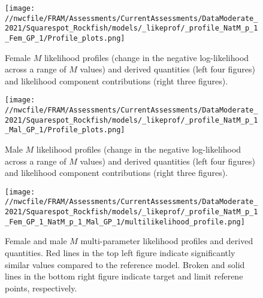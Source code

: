 \documentclass[11pt,
  english,
  a4paper,
]{article}
\begin{document}
\begin{figure}
\centering
\texttt{[image: //nwcfile/FRAM/Assessments/CurrentAssessments/DataModerate\_2021/Squarespot\_Rockfish/models/\_likeprof/\_profile\_NatM\_p\_1\_Fem\_GP\_1/Profile\_plots.png]}
\caption{Female {\(M\)\leavevmode\tagmcend\tagstructend} likelihood profiles (change in the negative log-likelihood across a range of {\(M\)\leavevmode\tagmcend\tagstructend} values) and derived quantities (left four figures) and likelihood component contributions (right three figures).\label{fig:M_f-profile-combo}}
\end{figure}

\tagmcend\tagstructend


\begin{figure}
\centering
\texttt{[image: //nwcfile/FRAM/Assessments/CurrentAssessments/DataModerate\_2021/Squarespot\_Rockfish/models/\_likeprof/\_profile\_NatM\_p\_1\_Mal\_GP\_1/Profile\_plots.png]}
\caption{Male {\(M\)\leavevmode\tagmcend\tagstructend} likelihood profiles (change in the negative log-likelihood across a range of {\(M\)\leavevmode\tagmcend\tagstructend} values) and derived quantities (left four figures) and likelihood component contributions (right three figures).\label{fig:M_m-profile-combo}}
\end{figure}

\tagmcend\tagstructend


\begin{figure}
\centering
\texttt{[image: //nwcfile/FRAM/Assessments/CurrentAssessments/DataModerate\_2021/Squarespot\_Rockfish/models/\_likeprof/\_profile\_NatM\_p\_1\_Fem\_GP\_1\_NatM\_p\_1\_Mal\_GP\_1/multilikelihood\_profile.png]}
\caption{Female and male {\(M\)\leavevmode\tagmcend\tagstructend} multi-parameter likelihood profiles and derived quantities. Red lines in the top left figure indicate significantly similar values compared to the reference model. Broken and solid lines in the bottom right figure indicate target and limit referene points, respectively.\label{fig:M-multiprofile-combo}}
\end{figure}
\end{document}
